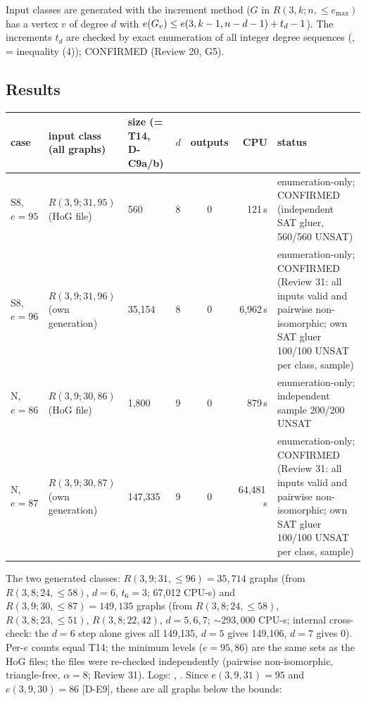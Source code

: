 Input classes are generated with the \cite{GR} increment method ($G$ in $R(3,k;n,{\le}e_{\max})$ has a vertex $v$ of degree $d$
with $e(G_{v}) \le e(3,k-1,n-d-1) + t_d - 1$). The increments $t_d$ are checked by exact enumeration of all integer
degree sequences (, = \cite{GR} inequality (4)); CONFIRMED (Review 20, G5).

\subsection{Results}\label{sec:glue-results}
\begin{center}\footnotesize
\begin{tabular}{@{}p{1.5cm} p{2.3cm} p{1.9cm} c c r p{4.3cm}@{}}
\toprule
case & input class (all graphs) & size (= \cite{GR} T14, D-C9a/b) & $d$ & outputs & CPU & status \\
\midrule
S8, $e = 95$ & $R(3,9;31,95)$ (HoG file) & 560 & 8 & 0 & 121\,s & enumeration-only; CONFIRMED (independent SAT gluer, 560/560 UNSAT) \\
S8, $e = 96$ & $R(3,9;31,96)$ (own generation) & 35,154 & 8 & 0 & 6,962\,s & enumeration-only; CONFIRMED (Review 31: all inputs valid and pairwise non-isomorphic; own SAT gluer 100/100 UNSAT per class, sample) \\
N, $e = 86$ & $R(3,9;30,86)$ (HoG file) & 1,800 & 9 & 0 & 879\,s & enumeration-only; independent sample 200/200 UNSAT \\
N, $e = 87$ & $R(3,9;30,87)$ (own generation) & 147,335 & 9 & 0 & 64,481\,s & enumeration-only; CONFIRMED (Review 31: all inputs valid and pairwise non-isomorphic; own SAT gluer 100/100 UNSAT per class, sample) \\
\bottomrule
\end{tabular}
\end{center}

The two generated classes: $R(3,9;31,{\le}96) = 35{,}714$ graphs (from $R(3,8;24,{\le}58)$, $d = 6$, $t_6 = 3$; 67,012 CPU-s)
and $R(3,9;30,{\le}87) = 149{,}135$ graphs (from $R(3,8;24,{\le}58)$, $R(3,8;23,{\le}51)$, $R(3,8;22,42)$, $d = 5,6,7$;
${\sim}293{,}000$ CPU-s; internal cross-check: the $d = 6$ step alone gives all 149,135, $d = 5$ gives 149,106, $d = 7$ gives 0). Per-$e$ counts equal \cite{GR} T14; the minimum levels ($e = 95, 86$) are the same sets as the
HoG files; the files were re-checked independently (pairwise non-isomorphic, triangle-free, $\alpha = 8$; Review 31). Logs: , .
Since $e(3,9,31) = 95$ and $e(3,9,30) = 86$ [D-E9], these are all graphs below the bounds:

